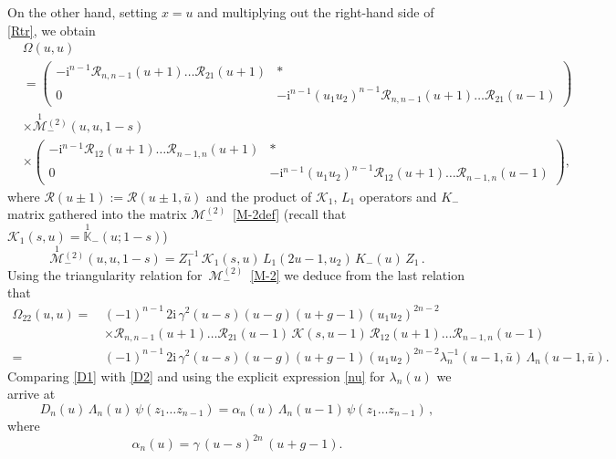 \documentclass[a4paper,11pt]{article}
\renewcommand{\imath}{\mathrm{i}}
\numberwithin{equation}{section}
\begin{document}
On the other hand, setting $x = u$ and multiplying out the right-hand side of \eqref{Rtr}, we obtain
\begin{align*}
	&
	\Omega(u,u) \\
	&
	=
    \begin{pmatrix}
        -\imath^{n-1}\mathcal{R}_{n,n-1}(u+1)\ldots\mathcal{R}_{21}(u+1) & \ast \\
        0 & -\imath^{n-1}(u_1u_2)^{n-1}\mathcal{R}_{n,n-1}(u+1)\ldots\mathcal{R}_{21}(u-1)
    \end{pmatrix} \\
	&
	\times \overset{1}{\mathcal{M}}{}^{(2)}_-(u,u,1-s) \\
	&
    \times \begin{pmatrix}
        -\imath^{n-1}\mathcal{R}_{12}(u+1)\ldots\mathcal{R}_{n-1,n}(u+1) & \ast \\
        0 & -\imath^{n-1}(u_1u_2)^{n-1}\mathcal{R}_{12}(u+1)\ldots\mathcal{R}_{n-1,n}(u-1)
    \end{pmatrix} ,
\end{align*} 
where $\mathcal{R}(u\pm 1) := \mathcal{R}(u\pm 1,\bar{u})$ and the product of $\mathcal{K}_1$, $L_1$ operators and $K_-$ matrix gathered into the matrix $\mathcal{M}^{(2)}_-$~\eqref{M-2def} (recall that $\mathcal{K}_1(s,u)=\overset{1}{\mathbb{K}}_-(u; 1-s)$)
\begin{equation} \nonumber
	\overset{1}{\mathcal{M}}{}^{(2)}_-(u,u,1-s) =
	Z_1^{-1}\,\mathcal{K}_1\left(s,u\right)\,L_1\left(2u-1,u_2\right)\,K_-(u)\,Z_1 \,.
\end{equation}
Using the triangularity relation for~$\mathcal{M}^{(2)}_-$~\eqref{M-2} we deduce from the last relation that
\begin{align}
	\nonumber
    \Omega_{22}(u,u) = \, & (-1)^{n-1}\,2\imath\,\gamma^2(u-s)(u-g)(u+g-1)(u_1u_2)^{2n-2} \\
    \nonumber
    &
    \times \mathcal{R}_{n,n-1}(u+1)\ldots\mathcal{R}_{21}(u-1)\,\mathcal{K}(s,u-1)\,\mathcal{R}_{12}(u+1)\ldots\mathcal{R}_{n-1,n}(u-1) \\
    \label{D2}
    = \, & (-1)^{n-1}\,2\imath\,\gamma^2(u-s)(u-g)(u+g-1)(u_1u_2)^{2n-2}\lambda_n^{-1}(u-1,\bar{u})\,\Lambda_n(u-1,\bar{u}) .
\end{align}
Comparing \eqref{D1} with \eqref{D2} and using the explicit expression \eqref{nu} for $\lambda_n(u)$ we arrive at
\begin{equation}\label{D_act}
    D_n(u)\,\Lambda_n(u)\,\psi(z_1 \ldots z_{n-1}) = \alpha_n(u)\,\Lambda_n(u-1)\,\psi(z_1 \ldots z_{n-1}) \,,
\end{equation}  
where
\begin{equation} \label{alpha_n}
    \alpha_n(u) = \gamma\,(u-s)^{2n}\,(u+g-1) .
\end{equation}
\end{document}
